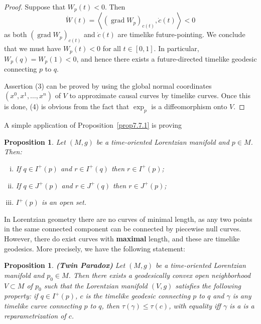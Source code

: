 \documentclass[10pt]{amsart}
\newcommand{\grad}{\operatorname{grad}}
\newtheorem{Prop}[Thm]{Proposition}
\theoremstyle{definition}
\theoremstyle{remark}
\begin{document}
\begin{proof}
Suppose that $W_p(t) < 0$. Then 
\[
\dot{W}(t) = \left\langle \left(\grad W_p\right)_{c(t)}, \dot{c}(t) \right\rangle < 0
\]
as both $\left(\grad W_p\right)_{c(t)}$ and $\dot{c}(t)$ are timelike future-pointing. We conclude that we must have $W_p(t)<0$ for all $t\in[0,1]$. In particular, $W_p(q)=W_p(1)<0$, and hence there exists a future-directed timelike geodesic connecting $p$ to $q$.

Assertion (3) can be proved by using the global normal coordinates $(x^0,x^1,\ldots,x^n)$ of $V$ to approximate causal curves by timelike curves. Once this is done, (4) is obvious from the fact that $\exp_p$ is a diffeomorphism onto $V$.
\end{proof}

A simple application of Proposition~\ref{prop7.7.1} is proving

\begin{Prop}
Let $(M,g)$ be a time-oriented Lorentzian manifold and $p \in M$. Then:
\begin{enumerate}[(i)]
\item
If $q \in I^+(p)$ and $r \in I^+(q)$ then $r \in I^+(p)$;
\item
If $q \in J^+(p)$ and $r \in J^+(q)$ then $r \in J^+(p)$;
\item
$I^+(p)$ is an open set.
\end{enumerate}
\end{Prop}

In Lorentzian geometry there are no curves of minimal length, as any two points in the same connected component can be connected by piecewise null curves. However, there do exist curves with {\bf maximal} length, and these are timelike geodesics. More precisely, we have the following statement:

\begin{Prop} \label{prop7.7.2}
{\bf (Twin Paradox)} Let $(M,g)$ be a time-oriented Lorentzian manifold and $p_0 \in M$. Then there exists a geodesically convex open neighborhood $V \subset M$ of $p_0$ such that the Lorentzian manifold $(V,g)$ satisfies the following property: if $q \in I^+(p)$, $c$ is the timelike geodesic connecting $p$ to $q$ and $\gamma$ is any timelike curve connecting $p$ to $q$, then $\tau(\gamma) \leq \tau(c)$, with equality iff $\gamma$ is a  is a reparametrization of $c$.
\end{Prop}
\end{document}
